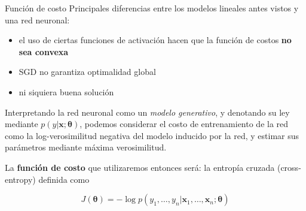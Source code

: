 \documentclass[handout, 9pt]{beamer}
\begin{document}
\begin{frame}{Función de costo}
Principales diferencias entre los modelos lineales antes vistos y una red neuronal:
\begin{itemize}
\item el uso de ciertas funciones de activación hacen que la función de costos \textbf{no sea convexa}
\item SGD no garantiza optimalidad global
\item ni siquiera buena solución
\end{itemize}

Interpretando la red neuronal como un \emph{modelo generativo}, y denotando su ley mediante $p(y|\bm{x}; \bm{\theta})$, podemos considerar el costo de entrenamiento de la red como la log-verosimilitud negativa del modelo inducido por la red, y estimar sus parámetros mediante máxima verosimilitud. \pause

La \textbf{función de costo} que utilizaremos entonces será: la entropía cruzada (cross-entropy) definida como \pause 

\begin{equation*}
J(\bm{\theta}) = -\log p(y_1,\ldots,y_n|\bm{x}_1,\ldots,\bm{x}_n; \bm{\theta})
\end{equation*}


\end{frame}
     
\end{document}
